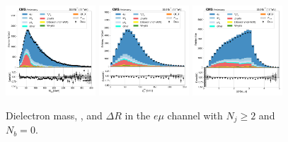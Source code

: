 \begin{figure}[htb!]
    \centering
    \includegraphics[width=0.3\textwidth]{chapters/Appendix/sectionPlots/figures/data_mc_overlays/emu_2016_cat_gt2_eq0_signal_linear_lepton_dilepton1_mass}
    \includegraphics[width=0.3\textwidth]{chapters/Appendix/sectionPlots/figures/data_mc_overlays/emu_2016_cat_gt2_eq0_signal_linear_lepton_dilepton1_pt}
    \includegraphics[width=0.3\textwidth]{chapters/Appendix/sectionPlots/figures/data_mc_overlays/emu_2016_cat_gt2_eq0_signal_linear_lepton_dilepton1_delta_r}
    \caption{Dielectron mass, \pt, and $\Delta R$ in the $e\mu$ channel
    with $N_{j} \geq 2$ and $N_{b} = 0$.}
    \label{fig:emu_4_dilepton}
\end{figure}

